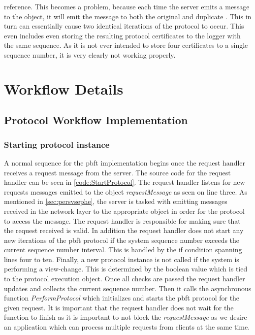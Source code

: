 reference. This becomes a problem, because each time the server emits a message to the  object, it will emit the message to both the original and duplicate . This in turn can essentially cause two identical iterations of the protocol to occur. This even includes even storing the resulting protocol certificates to the logger with the same sequence. As it is not ever intended to store four certificates to a single sequence number, it is very clearly not working properly. 

\section{Workflow Details}
\label{sec:protocolwork}
\subsection{Protocol Workflow Implementation}

\subsubsection{Starting protocol instance}
A normal sequence for the \ac{pbft} implementation begins once the request handler receives a request message from the server. The source code for the request handler can be seen in \autoref{code:StartProtocol}. The request handler listens for new requests messages emitted to the  object \emph{requestMessage} as seen on line three. As mentioned in \autoref{sec:persvsephe}, the server is tasked with emitting messages received in the network layer to the appropriate  object in order for the protocol to access the message. The request handler is responsible for making sure that the request received is valid. In addition the request handler does not start any new iterations of the \ac{pbft} protocol if the system sequence number exceeds the current sequence number interval. This is handled by the if condition spanning lines four to ten. Finally, a new protocol instance is not called if the system is performing a view-change. This is determined by the boolean value  which is tied to the protocol execution object. Once all checks are passed the request handler updates and collects the current sequence number. Then it calls the asynchronous  function \emph{PerformProtocol} which initializes and starts the \ac{pbft} protocol for the given request. It is important that the request handler does not wait for the  function to finish as it is important to not block the \emph{requestMessage} as we desire an application which can process multiple requests from clients at the same time.

